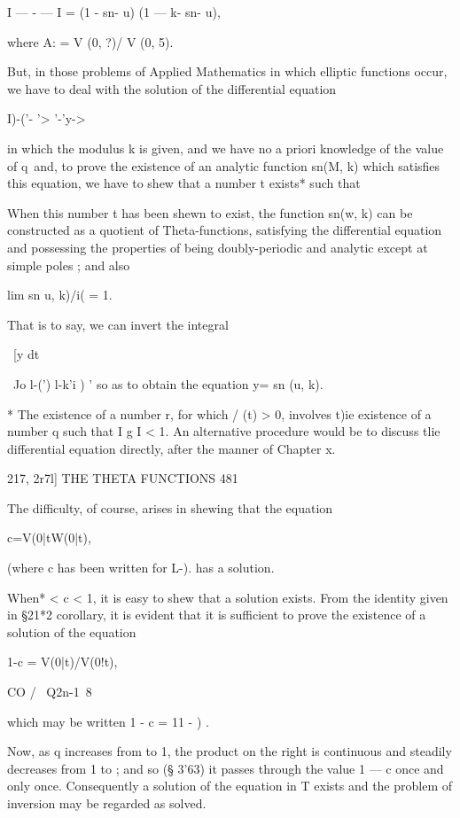 I — - — I = (1 - sn- u) (1 — k- sn- u),

where A: = V (0, ?)/ V (0, 5).

But, in those problems of Applied Mathematics in which elliptic
functions occur, we have to deal with the solution of the differential
equation



 I)-('- '> '-'y->



in which the modulus k is given, and we have no a priori knowledge of
the value of q\ and, to prove the existence of an analytic function
sn(M, k) which satisfies this equation, we have to shew that a number
t exists* such that

When this number t has been shewn to exist, the function sn(w, k) can
be constructed as a quotient of Theta-functions, satisfying the
differential equation and possessing the properties of being
doubly-periodic and analytic except at simple poles ; and also

lim sn u, k)/i( = 1.

That is to say, we can invert the integral

\ [y dt

 ~Jo l-(') l-k'i ) ' so as to obtain the equation y= sn (u, k).

* The existence of a number r, for which / (t) > 0, involves t)ie
existence of a number q such that I g I < 1. An alternative procedure
would be to discuss tlie differential equation directly, after the
manner of Chapter x.



217, 2r7l] THE THETA FUNCTIONS 481

The difficulty, of course, arises in shewing that the equation

c=V(0|tW(0|t),

(where c has been written for L-). has a solution.

When* < c < 1, it is easy to shew that a solution exists. From the
identity given in §21*2 corollary, it is evident that it is sufficient
to prove the existence of a solution of the equation

1-c = V(0|t)/V(0!t),

CO / \ Q2n-1\ 8

which may be written 1 - c = 11 - ) .

Now, as q increases from to 1, the product on the right is continuous
and steadily decreases from 1 to ; and so (§ 3'63) it passes through
the value 1 — c once and only once. Consequently a solution of the
equation in T exists and the problem of inversion may be regarded as
solved.

